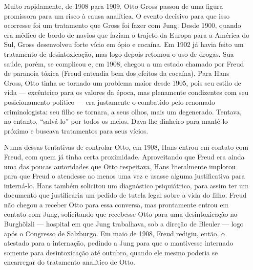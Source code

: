 Muito rapidamente, de 1908 para 1909, Otto Gross passou de uma figura
promissora para um risco à causa analítica. O evento decisivo para que
isso ocorresse foi um tratamento que Gross foi fazer com Jung. Desde
1900, quando era médico de bordo de navios que faziam o trajeto da
Europa para a América do Sul, Gross desenvolveu forte vício em ópio e
cocaína. Em 1902 já havia feito um tratamento de desintoxicação, mas
logo depois retomou o uso de drogas. Sua saúde, porém, se complicou e,
em 1908, chegou a um estado chamado por Freud de paranoia tóxica (Freud
entendia bem dos efeitos da cocaína). Para Hans Gross, Otto tinha se
tornado um problema maior desde 1905, pois seu estilo de vida ---
excêntrico para os valores da época, mas plenamente condizentes com seu
posicionamento político --- era justamente o combatido pelo renomado
criminologista: seu filho se tornara, a seus olhos, mais um degenerado.
Tentava, no entanto, ``salvá-lo'' por todos os meios. Dava-lhe dinheiro
para mantê-lo próximo e buscava tratamentos para seus vícios.

Numa dessas tentativas de controlar Otto, em 1908, Hans entrou em
contato com Freud, com quem já tinha certa proximidade. Aproveitando que
Freud era ainda uma das poucas autoridades que Otto respeitava, Hans
literalmente implorou para que Freud o atendesse ao menos uma vez e
usasse alguma justificativa para interná-lo. Hans também solicitou um
diagnóstico psiquiátrico, para assim ter um documento que justificaria
um pedido de tutela legal sobre a vida do filho. Freud não chegou a
receber Otto para essa conversa, mas prontamente entrou em contato com
Jung, solicitando que recebesse Otto para uma desintoxicação no
Burghölzli --- hospital em que Jung trabalhava, sob a direção de Bleuler
--- logo após o Congresso de Salzburgo. Em maio de 1908, Freud redigiu,
então, o atestado para a internação, pedindo a Jung para que o
mantivesse internado somente para desintoxicação até outubro, quando ele
mesmo poderia se encarregar do tratamento analítico de Otto.

